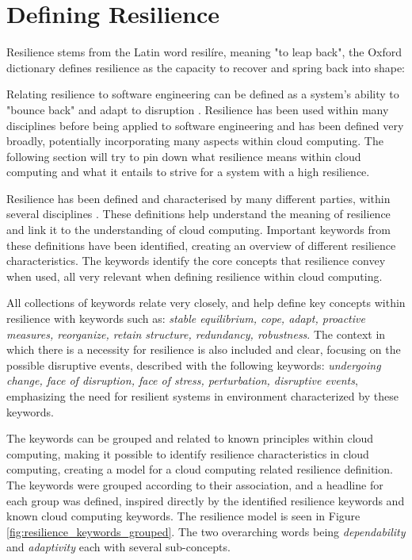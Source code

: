 \section{Defining Resilience}
Resilience stems from the Latin word resilíre, meaning "to leap back", the Oxford dictionary defines resilience as the capacity to recover and spring back into shape:


Relating resilience to software engineering can be defined as a system's ability to "bounce back" and adapt to disruption \cite{omer2013resilience}. Resilience has been used within many disciplines before being applied to software engineering and has been defined very broadly, potentially incorporating many aspects within cloud computing. The following section will try to pin down what resilience means within cloud computing and what it entails to strive for a system with a high resilience.

Resilience has been defined and characterised by many different parties, within several disciplines \cite{folke2002resilience, dalziell2004resilience, rose2005modeling, andersson2006urban, fiksel2003designing, bruneau2003framework, reed2009methodology, pavard2006design}.
These definitions help understand the meaning of resilience and link it to the understanding of cloud computing. Important keywords from these definitions have been identified, creating an overview of different resilience characteristics. The keywords identify the core concepts that resilience convey when used, all very relevant when defining resilience within cloud computing.

All collections of keywords relate very closely, and help define key concepts within resilience with keywords such as: \textit{stable equilibrium, cope, adapt, proactive measures, reorganize, retain structure, redundancy, robustness}. The context in which there is a necessity for resilience is also included and clear, focusing on the possible disruptive events, described with the following keywords: \textit{undergoing change, face of disruption, face of stress, perturbation, disruptive events}, emphasizing the need for resilient systems in environment characterized by these keywords.

The keywords can be grouped and related to known principles within cloud computing, making it possible to identify resilience characteristics in cloud computing, creating a model for a cloud computing related resilience definition. The keywords were grouped according to their association, and a headline for each group was defined, inspired directly by the identified resilience keywords and known cloud computing keywords. The resilience model is seen in Figure \ref{fig:resilience_keywords_grouped}. The two overarching words being \textit{dependability} and \textit{adaptivity} each with several sub-concepts.


